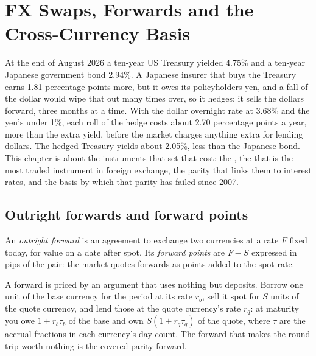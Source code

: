 \chapter{FX Swaps, Forwards and the Cross-Currency Basis}\label{ch:m2:fx-swaps-forwards-and-the-cross-currency-basis}

At the end of August 2026 a ten-year US Treasury yielded 4.75\% and a ten-year
Japanese government bond 2.94\%. A Japanese insurer that buys the Treasury
earns 1.81 percentage points more, but it owes its policyholders yen, and a fall
of the dollar would wipe that out many times over, so it hedges: it sells the
dollars forward, three months at a time. With the dollar overnight rate at
3.68\% and the yen's under 1\%, each roll of the hedge costs about 2.70
percentage points a year, more than the extra yield, before the market charges
anything extra for lending dollars. The hedged Treasury yields about 2.05\%,
less than the Japanese bond. This chapter is about the instruments that set
that cost: the , the  that is the most traded
instrument in foreign exchange, the parity that links them to interest rates,
and the basis by which that parity has failed since 2007.

\section{Outright forwards and forward points}

\begin{definition}\label{def:m2:fx-swaps-forwards-and-the-cross-currency-basis:forward}
An \emph{outright forward} is an agreement to exchange
two currencies at a rate $F$ fixed today, for value on a date after spot. Its
\emph{forward points} are $F - S$ expressed in pips of the
pair: the market quotes forwards as points added to the spot rate.
\end{definition}

A forward is priced by an argument that uses nothing but deposits. Borrow one
unit of the base currency for the period at its rate $r_b$, sell it spot for $S$
units of the quote currency, and lend those at the quote currency's rate $r_q$:
at maturity you owe $1 + r_b\tau_b$ of the base and own $S(1 + r_q\tau_q)$ of the
quote, where $\tau$ are the accrual fractions in each currency's day count. The
forward that makes the round trip worth nothing is the covered-parity forward.

